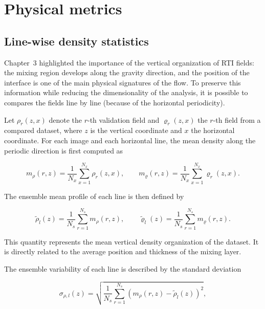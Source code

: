 \section{Physical metrics}

\subsection{Line-wise density statistics}

Chapter~3 highlighted the importance of the vertical organization of RTI
fields: the mixing region develops along the gravity direction, and the
position of the interface is one of the main physical signatures of the flow.
To preserve this information while reducing the dimensionality of the analysis, 
it is possible to compares the fields line by line (because of the horizontal periodicity).

Let $\rho_r(z,x)$ denote the $r$-th validation field and $\varrho_r(z,x)$ the
$r$-th field from a compared dataset, where $z$ is the vertical coordinate and
$x$ the horizontal coordinate. For each image and each horizontal line, the mean density
along the periodic direction is first computed as

\begin{equation}
    m_{\rho}(r,z)
    =
    \frac{1}{N_x}
    \sum_{x=1}^{N_x}\rho_r(z,x),
    \qquad
    m_{\varrho}(r,z)
    =
    \frac{1}{N_x}
    \sum_{x=1}^{N_x}\varrho_r(z,x).
\end{equation}

The ensemble mean profile of each line is then defined by

\begin{equation}
    \widetilde{\rho}_l(z)
    =
    \frac{1}{N_s}\sum_{r=1}^{N_s}m_{\rho}(r,z),
    \qquad
    \widetilde{\varrho}_l(z)
    =
    \frac{1}{N_s}\sum_{r=1}^{N_s}m_{\varrho}(r,z).
\end{equation}

This quantity represents the mean vertical density organization of the dataset.
It is directly related to the average position and thickness of the mixing
layer.

The ensemble variability of each line is described by the standard deviation

\begin{equation}
    \sigma_{\rho,l}(z)
    =
    \sqrt{
        \frac{1}{N_s}
        \sum_{r=1}^{N_s}
        \left(
            m_{\rho}(r,z)-\widetilde{\rho}_l(z)
        \right)^2
    },
\end{equation}

